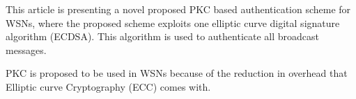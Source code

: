 \tiny

This article is presenting a novel proposed PKC based authentication scheme for WSNs, where the proposed scheme exploits one elliptic curve digital signature algorithm (ECDSA). This algorithm is used to authenticate all broadcast messages.

\bigskip

PKC is proposed to be used in WSNs because of the reduction in overhead that Elliptic curve Cryptography (ECC) comes with.